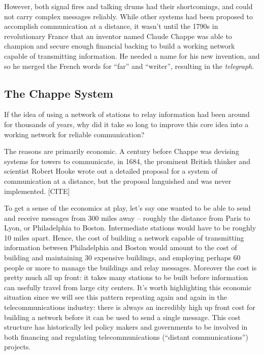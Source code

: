 \documentclass[UTF8]{book}
\begin{document}
\begin{CJK}{UTF8}{gbsn}
However, both signal fires and talking drums had their shortcomings, and could not carry complex messages reliably. While other systems had been proposed to accomplish communication at a distance, it wasn't until the 1790s in revolutionary France that an inventor named Claude Chappe was able to champion and secure enough financial backing to build a working network capable of transmitting information. He needed a name for his new invention, and so he merged the French words for ``far'' and ``writer'', resulting in the \emph{telegraph}.

\subsection{The Chappe System}

If the idea of using a network of stations to relay information had been around for thousands of years, why did it take so long to improve this core idea into a working network for reliable communication?

The reasons are primarily economic. A century before Chappe was devising systems for towers to communicate, in 1684, the prominent British thinker and scientist Robert Hooke wrote out a detailed proposal for a system of communication at a distance, but the proposal languished and was never implemented. [CITE]

To get a sense of the economics at play, let's say one wanted to be able to send and receive messages from 300 miles away -- roughly the distance from Paris to Lyon, or Philadelphia to Boston. Intermediate stations would have to be roughly 10 miles apart. Hence, the cost of building a network capable of transmitting information between Philadelphia and Boston would amount to the cost of building and maintaining 30 expensive buildings, and employing perhaps 60 people or more to manage the buildings and relay messages. Moreover the cost is pretty much all up front: it takes many stations to be built before information can usefully travel from large city centers. It's worth highlighting this economic situation since we will see this pattern repeating again and again in the telecommunications industry: there is always an incredibly high up front cost for building a network before it can be used to send a single message. This cost structure has historically led policy makers and governments to be involved in both financing and regulating telecommunications (``distant communications'') projects.


\end{CJK}
\end{document}

